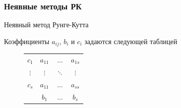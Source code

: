 \documentclass[t]{beamer}
\begin{document}
\begin{frame}
    \frametitle{Неявные методы РК}
    \begin{block}{Неявный метод Рунге-Кутта}
    \end{block}

    Коэффициенты $a_{ij}$, $b_i$ и $c_i$ задаются следующей таблицей

    \begin{block}{}
        \begin{figure}[h]
            \renewcommand{\arraystretch}{1.2}
            \begin{tabular}{c|ccc}
                $c_1$    & $a_{11}$ & $\ldots$ & $a_{1s}$ \\
                $\vdots$ & $\vdots$ & $\ddots$ & $\vdots$ \\
                $c_s$    & $a_{11}$ & $\ldots$ & $a_{ss}$ \\ \hline
                         & $b_{1}$  & $\ldots$ & $b_{s}$ \\
            \end{tabular}
        \end{figure}
    \end{block}
\end{frame}
\end{document}
